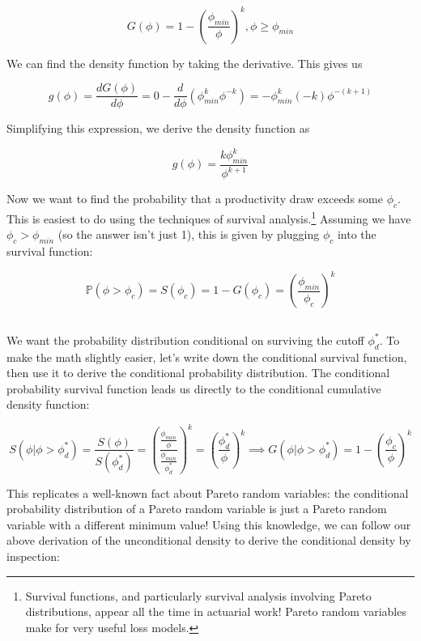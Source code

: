 \documentclass[12pt, letterpaper]{article}
\renewcommand{\Pr}[1]{\mathbb{P}(#1)}
\begin{document}
    \[ G(\phi) = 1 - \left(\frac{\phi_{min}}{\phi}\right)^k, \phi \geq \phi_{min}    \]

    We can find the density function by taking the derivative. This gives us

    \[ g(\phi) = \frac{dG(\phi)}{d\phi} = 0 - \frac{d}{d\phi} \left( \phi_{min}^k \phi^{-k} \right) = - \phi_{min}^k (-k) \phi^{-(k+1)}    \]

    Simplifying this expression, we derive the density function as

    \[ g(\phi) = \frac{k \phi_{min}^k}{\phi^{k + 1}}    \]

    Now we want to find the probability that a productivity draw exceeds some \(\phi_c\). This is easiest to do using the techniques of survival analysis.\footnote{Survival functions, and particularly survival analysis involving Pareto distributions, appear all the time in actuarial work! Pareto random variables make for very useful loss models.} Assuming we have \(\phi_c > \phi_{min}\) (so the answer isn't just 1), this is given by plugging \(\phi_c\) into the survival function:

    \[ \Pr{\phi > \phi_c} = S(\phi_c) = 1 - G(\phi_c) = \left(\frac{\phi_{min}}{\phi_c}\right)^k    \]

    \subsection{}

    We want the probability distribution conditional on surviving the cutoff \(\phi_d^*\). To make the math slightly easier, let's write down the conditional survival function, then use it to derive the conditional probability distribution. The conditional probability survival function leads us directly to the conditional cumulative density function:

    \[ S(\phi | \phi > \phi_d^*) = \frac{S(\phi)}{S(\phi_d^*)} = \left(\frac{\frac{\phi_{min}}{\phi}}{\frac{\phi_{min}}{\phi_d^*}}\right)^k = \left(\frac{\phi_d^*}{\phi}\right)^k \implies G(\phi | \phi > \phi_d^*) = 1 - \left( \frac{\phi_c}{\phi} \right)^k    \]

    This replicates a well-known fact about Pareto random variables: the conditional probability distribution of a Pareto random variable is just a Pareto random variable with a different minimum value! Using this knowledge, we can follow our above derivation of the unconditional density to derive the conditional density by inspection:
\end{document}
